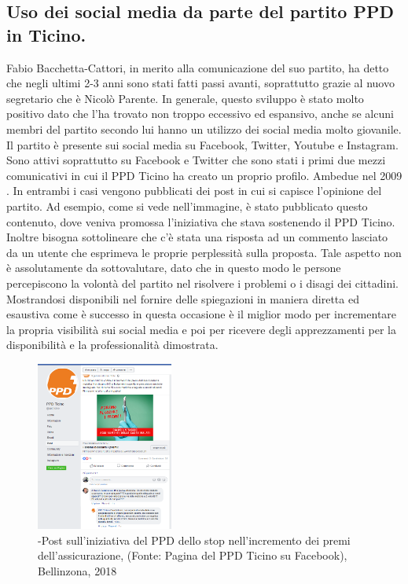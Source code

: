 \subsection{Uso dei social media da parte del partito PPD in Ticino.}
Fabio Bacchetta-Cattori, in merito alla comunicazione del suo partito, ha detto che negli ultimi 2-3 anni sono stati fatti passi avanti, soprattutto grazie al nuovo segretario che è Nicolò Parente. In generale, questo sviluppo è stato molto positivo dato che l’ha trovato non troppo eccessivo ed espansivo, anche se alcuni membri del partito secondo lui hanno un utilizzo dei social media molto giovanile. Il partito è presente sui social media su Facebook, Twitter, Youtube e Instagram. Sono attivi soprattutto su Facebook e Twitter che sono stati i primi due mezzi comunicativi in cui il PPD Ticino ha creato un proprio profilo. Ambedue nel 2009 . In entrambi i casi vengono pubblicati dei post in cui si capisce l’opinione del partito. Ad esempio, come si vede nell’immagine, è stato pubblicato questo contenuto, dove veniva promossa l’iniziativa che stava sostenendo il PPD Ticino. Inoltre bisogna sottolineare che c’è stata una risposta ad un commento lasciato da un utente che esprimeva le proprie perplessità sulla proposta. Tale aspetto non è assolutamente da sottovalutare, dato che in questo modo le persone percepiscono la volontà del partito nel risolvere i problemi o i disagi dei cittadini. Mostrandosi disponibili nel fornire delle spiegazioni in maniera diretta ed esaustiva come è successo in questa occasione è il miglior modo per incrementare la propria visibilità sui social media e poi per ricevere degli apprezzamenti per la disponibilità e la professionalità dimostrata.

\begin{figure}[h!]
    \centering
    \includegraphics[width=0.4\textwidth]{capitoli/foto/PPD.png}
    \caption{-Post sull’iniziativa del PPD dello stop nell’incremento dei premi dell’assicurazione, (Fonte: Pagina del PPD Ticino su Facebook), Bellinzona, 2018}
    \label{fig:my_label}
\end{figure}

